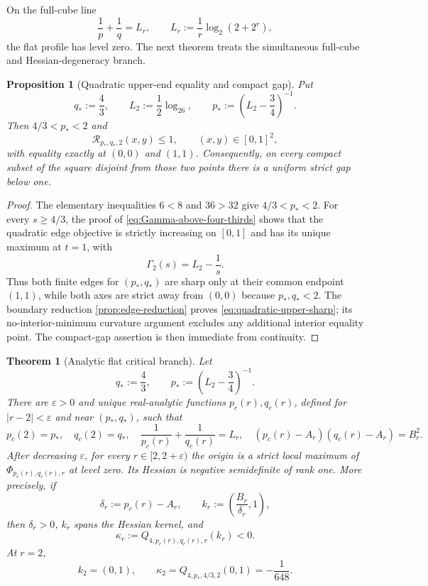 \documentclass[11pt,reqno]{amsart}
\numberwithin{equation}{section}
\newtheorem{theorem}{Theorem}[section]
\newtheorem{proposition}[proposition]{Proposition}
\theoremstyle{definition}
\theoremstyle{remark}
\newcommand{\logtwo}{\log_2}
\begin{document}
On the full-cube line
\begin{equation}\label{eq:full-cube-line-r}
  \frac1p+\frac1q=L_r,
  \qquad
  L_r:=\frac1r\logtwo(2+2^r),
\end{equation}
the flat profile has level zero.  The next theorem treats the simultaneous
full-cube and Hessian-degeneracy branch.

\begin{proposition}[Quadratic upper-end equality and compact gap]
\label{prop:quadratic-upper-gap}
Put
\[
  q_*:=\frac43,\qquad
  L_2:=\frac12\logtwo6,\qquad
  p_*:=\left(L_2-\frac34\right)^{-1}.
\]
Then $4/3<p_*<2$ and
\begin{equation}\label{eq:quadratic-upper-sharp}
  \mathcal R_{p_*,q_*,2}(x,y)\le1,
  \qquad (x,y)\in[0,1]^2,
\end{equation}
with equality exactly at $(0,0)$ and $(1,1)$.  Consequently, on every compact
subset of the square disjoint from those two points there is a uniform strict
gap below one.
\end{proposition}

\begin{proof}
The elementary inequalities $6<8$ and $36>32$ give
$4/3<p_*<2$.  For every $s\ge4/3$, the proof of
\eqref{eq:Gamma-above-four-thirds} shows that the quadratic edge objective is
strictly increasing on $[0,1]$ and has its unique maximum at $t=1$, with
\[
  \Gamma_2(s)=L_2-\frac1s.
\]
Thus both finite edges for $(p_*,q_*)$ are sharp only at their common endpoint
$(1,1)$, while both axes are strict away from $(0,0)$ because
$p_*,q_*<2$.  The boundary reduction \cref{prop:edge-reduction} proves
\eqref{eq:quadratic-upper-sharp}; its no-interior-minimum curvature argument
excludes any additional interior equality point.  The compact-gap assertion is
then immediate from continuity.
\end{proof}

\begin{theorem}[Analytic flat critical branch]
\label{thm:flat-critical-branch}
Let
\[
  q_*:=\frac43,\qquad
  p_*:=\left(L_2-\frac34\right)^{-1}.
\]
There are $\varepsilon>0$ and unique real-analytic functions $p_c(r),q_c(r)$,
defined for $|r-2|<\varepsilon$ and near $(p_*,q_*)$, such that
\begin{equation}\label{eq:flat-critical-branch}
  p_c(2)=p_*,
  \quad q_c(2)=q_*,
  \quad \frac1{p_c(r)}+\frac1{q_c(r)}=L_r,
  \quad
  (p_c(r)-A_r)(q_c(r)-A_r)=B_r^2.
\end{equation}
After decreasing $\varepsilon$, for every $r\in[2,2+\varepsilon)$ the origin
is a strict local maximum of $\Phi_{p_c(r),q_c(r),r}$ at level zero.  Its
Hessian is negative semidefinite of rank one.  More precisely, if
\[
  \delta_r:=p_c(r)-A_r,
  \qquad
  k_r:=\left(\frac{B_r}{\delta_r},1\right),
\]
then $\delta_r>0$, $k_r$ spans the Hessian kernel, and
\begin{equation}\label{eq:flat-kernel-quartic}
  \kappa_r:=Q_{4,p_c(r),q_c(r),r}(k_r)<0.
\end{equation}
At $r=2$,
\[
  k_2=(0,1),
  \qquad
  \kappa_2=Q_{4,p_*,4/3,2}(0,1)=-\frac1{648}.
\]
\end{theorem}
\end{document}
